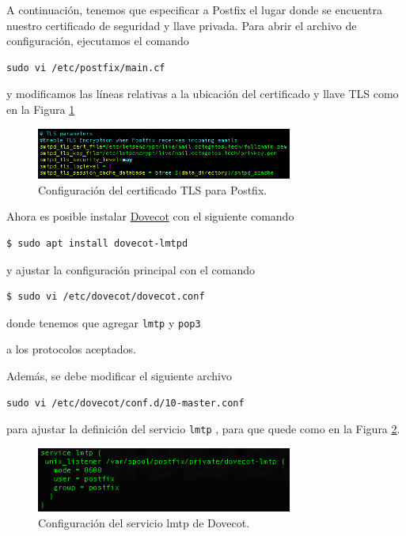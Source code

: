 \documentclass{article}
\newcommand{\ttt}[1]{%
\texttt{#1}%
}
\begin{document}
A continuaci\'on, tenemos que especificar a Postfix
el lugar donde se encuentra nuestro certificado de
seguridad y llave privada.   Para abrir el archivo
de configuraci\'on, ejecutamos el comando
\begin{lstlisting}
sudo vi /etc/postfix/main.cf
\end{lstlisting}
y modificamos las l\'ineas relativas a la ubicaci\'on
del certificado y llave TLS como en la Figura
\ref{fig:email-tlsLocation}

\begin{figure}[H]
  \centering
  \includegraphics[width=0.75\textwidth]{email/tlsLocation}
  \caption{Configuraci\'on del certificado TLS para Postfix.}
  \label{fig:email-tlsLocation}
\end{figure}

Ahora es posible instalar
\href{https://www.dovecot.org/}{Dovecot} con el
siguiente comando
\begin{lstlisting}
$ sudo apt install dovecot-lmtpd
\end{lstlisting}
y ajustar la configuraci\'on principal con
el comando
\begin{lstlisting}
$ sudo vi /etc/dovecot/dovecot.conf
\end{lstlisting}
donde tenemos que agregar \ttt{lmtp} y \ttt{pop3}
a los protocolos aceptados.

Adem\'as, se debe modificar el siguiente archivo
\begin{lstlisting}
sudo vi /etc/dovecot/conf.d/10-master.conf
\end{lstlisting}
para ajustar la definici\'on del servicio \ttt{lmtp},
para que quede como en la Figura \ref{fig:email-lmtp}.

\begin{figure}[H]
  \centering
  \includegraphics[width=0.75\textwidth]{email/lmtp}
  \caption{Configuraci\'on del servicio lmtp de Dovecot.}
  \label{fig:email-lmtp}
\end{figure}
\end{document}
